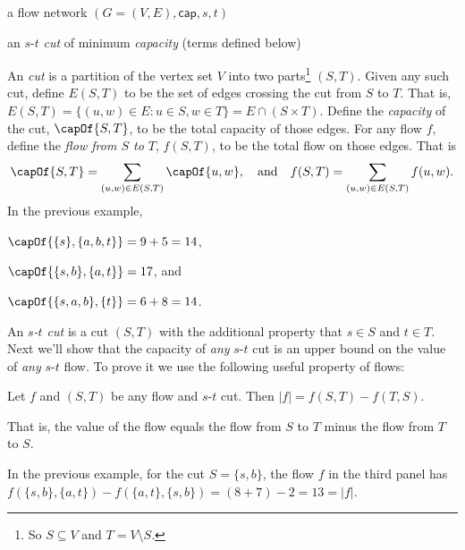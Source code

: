 \begin{mylist}
\item[\bf input:]
  a flow network $(G=(V,E), \textsf{cap}, s, t)$

\item[\bf output:]
  an $s$-$t$ \emph{cut} of minimum \emph{capacity} (terms defined below)
\end{mylist}

An \emph{cut} %
is a partition of the vertex set $V$ into two parts\footnote
{So $S\subseteq V$ and $T=V\setminus S$.} $(S,T)$.
Given any such cut, define $E(S,T)$ to be the set of edges crossing the cut from $S$ to $T$.
That is, $E(S,T) = \{(u,w) \in E : u\in S, w \in T\} = E\cap (S\times T)$.
Define the \emph{capacity} of the cut, $\capOf {S, T}$,
to be the total capacity of those edges.
For any flow $f$,
define the \emph{flow from $S$ to $T$}, $f(S, T)$,
to be the total flow on those edges.  That is
\[
  \capOf {S, T} = \sum_{(u,w) \in E(S, T)} \capOf {u,w}, \text{~~~and~~~}
  f(S, T) = \sum_{(u,w) \in E(S, T)} f(u,w).
\]
In the previous example,
\begin{mylist}
\item $\capOf{\{s\}, \{a,b,t\}} = 9 + 5 = 14$,
\item $\capOf{\{s, b\}, \{a,t\}} = 17$, and
\item $\capOf{\{s,a,b\}, \{t\}} = 6 + 8 = 14$. 
\end{mylist}

An \emph{$s$-$t$ cut} is a cut $(S, T)$ with the additional property that $s\in S$ and $t\in T$.
Next we'll show that the capacity of \emph{any} $s$-$t$ cut
is an upper bound on the value of \emph{any} $s$-$t$ flow.
To prove it we use the following useful property of flows:

\begin{lemma}\label{flow: across cut}
  Let $f$ and $(S, T)$ be any flow and $s$-$t$ cut.
  Then \(|f| = f(S, T) - f(T, S)\).

  That is, the value of the flow equals
  the flow from $S$ to $T$ minus the flow from $T$ to $S$.
\end{lemma}
In the previous example, for the cut $S=\{s,b\}$, the flow $f$ in the third panel
has $f(\{s,b\}, \{a,t\}) - f(\{a,t\}, \{s,b\}) = (8+7) - 2 = 13 = |f|$.


